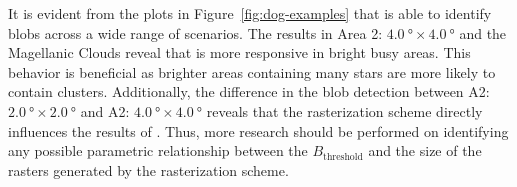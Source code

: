 It is evident from the plots in Figure~\ref{fig:dog-examples} that \blobdog{} is
able to identify blobs across a wide range of scenarios. The results in Area 2:
$\SI{4.0}{\degree}\times\SI{4.0}{\degree}$ and the Magellanic Clouds reveal that
\blobdog{} is more responsive in bright busy areas. This behavior is beneficial
as brighter areas containing many stars are more likely to contain clusters.
Additionally, the difference in the blob detection between A2:
$\SI{2.0}{\degree}\times\SI{2.0}{\degree}$ and A2:
$\SI{4.0}{\degree}\times\SI{4.0}{\degree}$ reveals that the rasterization scheme
directly influences the results of \blobdog{}. Thus, more research should be
performed on identifying any possible parametric relationship between the
$B_{\text{threshold}}$ and the size of the rasters generated by the
rasterization scheme.

\newpage
